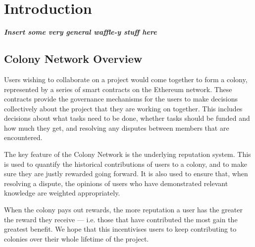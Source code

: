 \section{Introduction}


\textbf{\emph{Insert some very general waffle-y stuff here}}

\subsection{Colony Network Overview}

Users wishing to collaborate on a project would come together to form a colony, represented by a series of smart contracts on the Ethereum network. These contracts provide the governance mechanisms for the users to make decisions collectively about the project that they are working on together. This includes decisions about what tasks need to be done, whether tasks should be funded and how much they get, and resolving any disputes between members that are encountered.

The key feature of the Colony Network is the underlying reputation system. This is used to quantify the historical contributions of users to a colony, and to make sure they are justly rewarded going forward. It is also used to ensure that, when resolving a dispute, the opinions of users who have demonstrated relevant knowledge are weighted appropriately. 

When the colony pays out rewards, the more reputation a user has the greater the reward they receive --- i.e. those that have contributed the most gain the greatest benefit. We hope that this incentivises users to keep contributing to colonies over their whole lifetime of the project.
